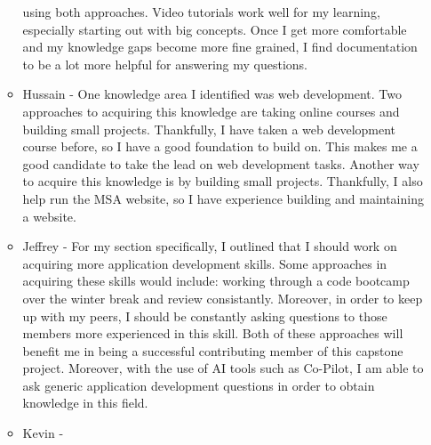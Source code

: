 \begin{enumerate}
\begin{itemize}
          using both approaches. Video tutorials work well for my learning,
          especially starting out with big concepts. Once I get more
          comfortable and my knowledge gaps become more fine grained, I find
          documentation to be a lot more helpful for answering my questions.
        \item Hussain - One knowledge area I identified was web development. Two
        approaches to acquiring this knowledge are taking online courses and
        building small projects. Thankfully, I have taken a web development
        course before, so I have a good foundation to build on. This makes me a
        good candidate to take the lead on web development tasks. Another way
        to acquire this knowledge is by building small projects. Thankfully, I 
        also help run the MSA website, so I have experience building and
        maintaining a website. 
        \item Jeffrey - For my section specifically, I outlined that I should
        work on acquiring more application development skills. Some approaches
        in acquiring these skills would include: working through a code
        bootcamp over the winter break and review consistantly. Moreover,
        in order to keep up with my peers, I should be constantly asking
        questions to those members more experienced in this skill. Both
        of these approaches will benefit me in being a successful 
        contributing member of this capstone project. Moreover, with 
        the use of AI tools such as Co-Pilot, I am able to ask generic
        application development questions in order to obtain knowledge
        in this field.
        \item Kevin - 
  \end{itemize} 
\end{enumerate}
